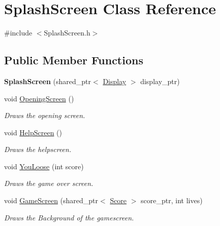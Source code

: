 \hypertarget{class_splash_screen}{}\section{Splash\+Screen Class Reference}
\label{class_splash_screen}


{\ttfamily \#include $<$Splash\+Screen.\+h$>$}

\subsection*{Public Member Functions}
\begin{DoxyCompactItemize}
\item 
\mbox{\label{class_splash_screen_a1e61f315445dd725cdbeac840e9bba17}} 
{\bfseries Splash\+Screen} (shared\+\_\+ptr$<$ \mbox{\hyperlink{class_display}{Display}} $>$ display\+\_\+ptr)
\item 
\mbox{\label{class_splash_screen_a3bf88eb0bf0940a7ffd265a9963db192}} 
void \mbox{\hyperlink{class_splash_screen_a3bf88eb0bf0940a7ffd265a9963db192}{Opening\+Screen}} ()
\begin{DoxyCompactList}\small\item\em Draws the opening screen. \end{DoxyCompactList}\item 
\mbox{\label{class_splash_screen_a972f1af2a9adf8fd18c934aa703f4c80}} 
void \mbox{\hyperlink{class_splash_screen_a972f1af2a9adf8fd18c934aa703f4c80}{Help\+Screen}} ()
\begin{DoxyCompactList}\small\item\em Draws the helpscreen. \end{DoxyCompactList}\item 
void \mbox{\hyperlink{class_splash_screen_a0fec044f81b02f9ba6c94ca9ed01d100}{You\+Loose}} (int score)
\begin{DoxyCompactList}\small\item\em Draws the game over screen. \end{DoxyCompactList}\item 
void \mbox{\hyperlink{class_splash_screen_a239fe0cad561285bd029a8042c2a8039}{Game\+Screen}} (shared\+\_\+ptr$<$ \mbox{\hyperlink{class_score}{Score}} $>$ score\+\_\+ptr, int lives)
\begin{DoxyCompactList}\small\item\em Draws the Background of the gamescreen. \end{DoxyCompactList}\item 

\end{DoxyCompactItemize}
